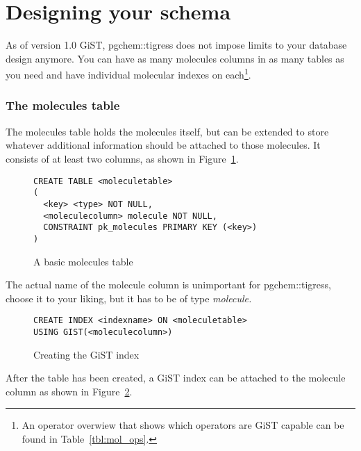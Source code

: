 \documentclass[a4paper]{article}
\begin{document}
\part{Designing your schema}
As of version 1.0 GiST, pgchem::tigress does not impose limits to your database design anymore. You can have as many molecules columns in as many tables as you need and have individual molecular indexes on each\footnote{An operator overwiew that shows which operators are GiST capable can be found in Table~\ref{tbl:mol_ops}.}.
\section{The molecules table}
The molecules table holds the molecules itself, but can be extended to store whatever additional information should be attached to those molecules. It consists of at least two columns, as shown in Figure~\ref{fig:basic_mol_table}.

\begin{figure}[tb]
\begin{verbatim}
CREATE TABLE <moleculetable>
(
  <key> <type> NOT NULL,
  <moleculecolumn> molecule NOT NULL,
  CONSTRAINT pk_molecules PRIMARY KEY (<key>)
) 
\end{verbatim}
\caption{A basic molecules table}
	\label{fig:basic_mol_table}
\end{figure}
The actual name of the molecule column is unimportant for pgchem::tigress, choose it to your liking, but it has to be of type \itshape molecule\normalfont.
\begin{figure}[tb]
\begin{verbatim}
CREATE INDEX <indexname> ON <moleculetable>
USING GIST(<moleculecolumn>)
\end{verbatim}
\caption{Creating the GiST index}
	\label{fig:crea_gist}
\end{figure}
After the table has been created, a GiST index can be attached to the molecule column as shown in Figure~\ref{fig:crea_gist}.
\end{document}
